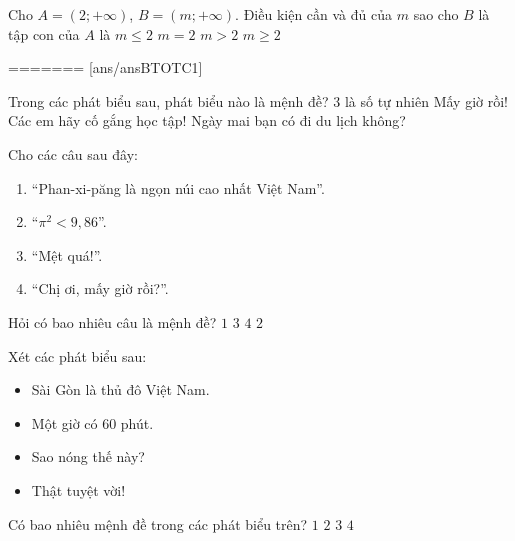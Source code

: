 \begin{ex}%
	Cho $A=(2;+\infty)$, $B=(m;+\infty)$. Điều kiện cần và đủ của $m$ sao cho $B$ là tập con của $A$ là
	\choice
	{$m\leqslant 2$}
	{$m=2$}
	{$m>2$}
	{\True $m\geqslant 2$}
\end{ex}

=======
[ans/ansBTOTC1]
\begin{ex}%
	Trong các phát biểu sau, phát biểu nào là mệnh đề?
	\choice
	{\True $3$ là số tự nhiên}
	{Mấy giờ rồi!}
	{Các em hãy cố gắng học tập!}
	{Ngày mai bạn có đi du lịch không?}
\end{ex}

\begin{ex}%
	Cho các câu sau đây:
	\begin{enumerate}
		\item ``Phan-xi-păng là ngọn núi cao nhất Việt Nam''.
		\item ``$\pi^2<9,86$''.
		\item ``Mệt quá!''.
		\item ``Chị ơi, mấy giờ rồi?''.
	\end{enumerate}
	Hỏi có bao nhiêu câu là mệnh đề?
	\choice
	{$1$}
	{$3$}
	{$4$}
	{\True $2$}
\end{ex}
\begin{ex}%
	Xét các phát biểu sau:
	\begin{itemize}
		\item Sài Gòn là thủ đô Việt Nam.
		\item Một giờ có 60 phút.
		\item Sao nóng thế này?
		\item Thật tuyệt vời!
	\end{itemize}
	Có bao nhiêu mệnh đề trong các phát biểu trên?
	\choice
	{$1$}
	{\True $2$}
	{$3$}
	{$4$}
\end{ex}

